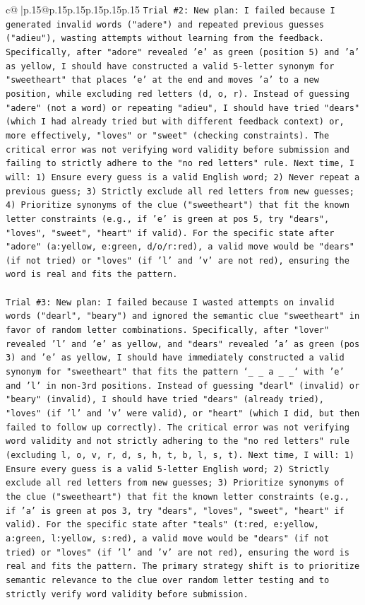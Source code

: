 \documentclass{article}
\begin{document}
{\begin{supertabular}{c@{$\;$}|p{.15\linewidth}@{}p{.15\linewidth}p{.15\linewidth}p{.15\linewidth}p{.15\linewidth}p{.15\linewidth}}
{{{\texttt{Trial \#2: New plan: I failed because I generated invalid words ("adere") and repeated previous guesses ("adieu"), wasting attempts without learning from the feedback. Specifically, after "adore" revealed 'e' as green (position 5) and 'a' as yellow, I should have constructed a valid 5{-}letter synonym for "sweetheart" that places 'e' at the end and moves 'a' to a new position, while excluding red letters (d, o, r). Instead of guessing "adere" (not a word) or repeating "adieu", I should have tried "dears" (which I had already tried but with different feedback context) or, more effectively, "loves" or "sweet" (checking constraints). The critical error was not verifying word validity before submission and failing to strictly adhere to the "no red letters" rule. Next time, I will: 1) Ensure every guess is a valid English word; 2) Never repeat a previous guess; 3) Strictly exclude all red letters from new guesses; 4) Prioritize synonyms of the clue ("sweetheart") that fit the known letter constraints (e.g., if 'e' is green at pos 5, try "dears", "loves", "sweet", "heart" if valid). For the specific state after "adore" (a:yellow, e:green, d/o/r:red), a valid move would be "dears" (if not tried) or "loves" (if 'l' and 'v' are not red), ensuring the word is real and fits the pattern.} \\
\\ 
\texttt{Trial \#3: New plan: I failed because I wasted attempts on invalid words ("dearl", "beary") and ignored the semantic clue "sweetheart" in favor of random letter combinations. Specifically, after "lover" revealed 'l' and 'e' as yellow, and "dears" revealed 'a' as green (pos 3) and 'e' as yellow, I should have immediately constructed a valid synonym for "sweetheart" that fits the pattern `\_ \_ a \_ \_` with 'e' and 'l' in non{-}3rd positions. Instead of guessing "dearl" (invalid) or "beary" (invalid), I should have tried "dears" (already tried), "loves" (if 'l' and 'v' were valid), or "heart" (which I did, but then failed to follow up correctly). The critical error was not verifying word validity and not strictly adhering to the "no red letters" rule (excluding l, o, v, r, d, s, h, t, b, l, s, t). Next time, I will: 1) Ensure every guess is a valid 5{-}letter English word; 2) Strictly exclude all red letters from new guesses; 3) Prioritize synonyms of the clue ("sweetheart") that fit the known letter constraints (e.g., if 'a' is green at pos 3, try "dears", "loves", "sweet", "heart" if valid). For the specific state after "teals" (t:red, e:yellow, a:green, l:yellow, s:red), a valid move would be "dears" (if not tried) or "loves" (if 'l' and 'v' are not red), ensuring the word is real and fits the pattern. The primary strategy shift is to prioritize semantic relevance to the clue over random letter testing and to strictly verify word validity before submission.} \\
}}}
\end{supertabular}}
\end{document}
